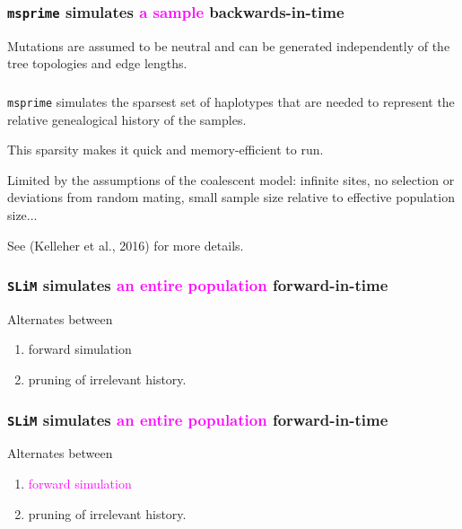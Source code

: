 \documentclass[11pt, mathserif, aspectratio=169]{beamer}
\newcommand{\magenta}[1]{\textcolor{magenta}{#1}}
\newenvironment{wideitemize}{\itemize\addtolength{\itemsep}{10pt}}{\enditemize}
\begin{document}
\begin{frame}
\frametitle{\texttt{msprime} simulates \magenta{a sample} backwards-in-time}
\begin{minipage}{.48\textwidth}

\end{minipage}\hfill
\begin{minipage}{.48\textwidth}
\begin{wideitemize}
\item Mutations are assumed to be neutral and can be generated independently of the tree topologies and edge lengths.
\end{wideitemize}
\end{minipage}
\end{frame}

\begin{frame}
\frametitle{}
\begin{wideitemize}
\item \texttt{msprime} simulates the sparsest set of haplotypes that are needed to represent the relative genealogical history of the samples.
\item This sparsity makes it quick and memory-efficient to run.
\item Limited by the assumptions of the coalescent model: infinite sites, no selection or deviations from random mating, small sample size relative to effective population size...
\item See (Kelleher et al., 2016) for more details.
\end{wideitemize}
\end{frame}

\begin{frame}
\frametitle{\texttt{SLiM} simulates \magenta{an entire population} forward-in-time}
\begin{minipage}{.58\textwidth}

\end{minipage}\hfill
\begin{minipage}{.4\textwidth}
Alternates between
\begin{enumerate}
\item forward simulation
\item pruning of irrelevant history.
\end{enumerate}
\end{minipage}
\end{frame}

\begin{frame}
\frametitle{\texttt{SLiM} simulates \magenta{an entire population} forward-in-time}
\begin{minipage}{.58\textwidth}

\end{minipage}\hfill
\begin{minipage}{.4\textwidth}
Alternates between
\begin{enumerate}
\item \magenta{forward simulation}
\item pruning of irrelevant history.
\end{enumerate}
\end{minipage}
\end{frame}
\end{document}

